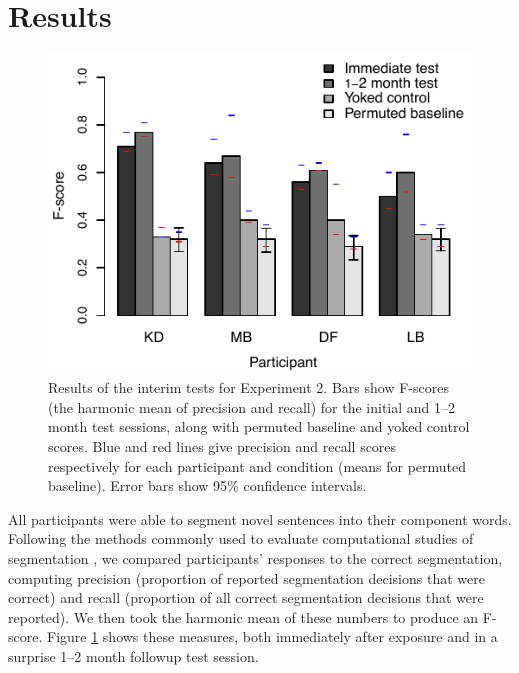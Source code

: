 \documentclass[10pt]{article}
\begin{document}
\section*{Results}

\begin{figure}[t]
\begin{center}
\includegraphics{figures/interim_test_col.pdf}
\caption{\label{fig:interim} Results of the interim tests for Experiment 2. Bars show F-scores (the harmonic mean of precision and recall) for the initial and 1--2 month test sessions, along with permuted baseline and yoked control scores. Blue and red lines give precision and recall scores respectively for each participant and condition (means for permuted baseline). Error bars show 95\% confidence intervals.}
\end{center}
\end{figure}

All participants were able to segment novel sentences into their component words.  Following the methods commonly used to evaluate computational studies of segmentation \cite{brent1999b,goldwater2009}, we compared participants' responses to the correct segmentation, computing precision (proportion of reported segmentation decisions that were correct) and recall (proportion of all correct segmentation decisions that were reported). We then took the harmonic mean of these numbers to produce an F-score. Figure \ref{fig:interim} shows these measures, both immediately after exposure and in a surprise 1--2 month followup test session. 
\end{document}
